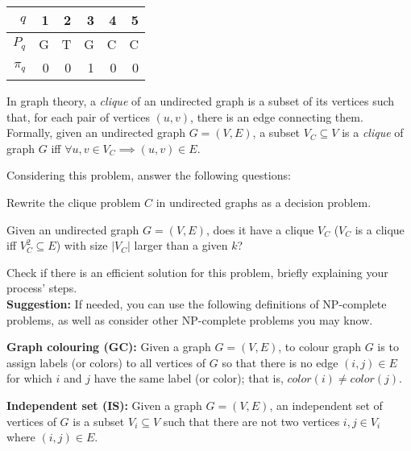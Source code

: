 \documentclass{cal}
\begin{document}
{\begin{center} \begin{tabular}{r | rrrrr}
    $q$     & 1 & 2 & 3 & 4 & 5 \\ \hline
    $P_q$   & G & T & G & C & C \\ \hline
    $\pi_q$ & 0 & 0 & 1 & 0 & 0
\end{tabular} \end{center}

In graph theory, a \emph{clique} of an undirected graph is a subset of its vertices such that, for each pair of vertices $(u, v)$, there is an edge connecting them. Formally, given an undirected graph $G=(V,E)$, a subset $V_C \subseteq V$ is a \emph{clique} of graph $G$ iff $\forall u, v \in V_C \implies (u,v) \in E$.

Considering this problem, answer the following questions:

Rewrite the clique problem $C$ in undirected graphs as a decision problem.

\ansseparator

Given an undirected graph $G=(V,E)$, does it have a clique $V_C$ ($V_C$ is a clique iff $V_C^2 \subseteq E$) with size $|V_C|$ larger than a given $k$?

Check if there is an efficient solution for this problem, briefly explaining your process' steps.\\

\textbf{Suggestion:} If needed, you can use the following definitions of NP-complete problems, as well as consider other NP-complete problems you may know.

\textbf{Graph colouring (GC):} Given a graph $G=(V,E)$, to colour graph $G$ is to assign labels (or colors) to all vertices of $G$ so that there is no edge $(i,j) \in E$ for which $i$ and $j$ have the same label (or color); that is, $color(i) \neq color(j)$.

\textbf{Independent set (IS):} Given a graph $G=(V,E)$, an independent set of vertices of $G$ is a subset $V_i \subseteq V$ such that there are not two vertices $i, j \in V_i$ where $(i,j) \in E$.

\ansseparator

}
\end{document}

